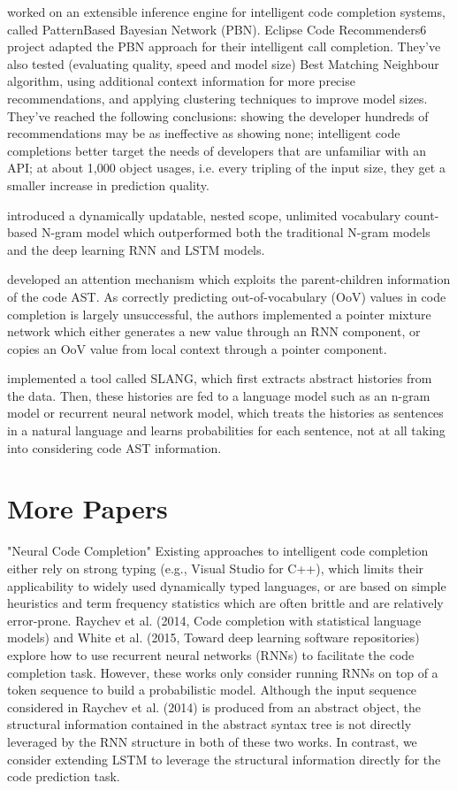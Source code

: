 \cite{Prok15a} worked on an extensible inference engine for intelligent code completion
systems, called PatternBased Bayesian Network (PBN). Eclipse Code Recommenders6 project adapted
the PBN approach for their intelligent call completion. They've also tested (evaluating quality,
speed and model size) Best Matching Neighbour algorithm, using additional context information
for more precise recommendations, and applying clustering techniques to improve model sizes.
They've reached the following conclusions: showing the developer hundreds of recommendations
may be as ineffective as showing none; intelligent code completions better target the needs of
developers that are unfamiliar with an API; at about 1,000 object usages, i.e. every tripling
of the input size, they get a smaller increase in prediction quality.

\cite{Hell17a} introduced a dynamically updatable, nested scope, unlimited vocabulary
count-based N-gram model which outperformed both the traditional N-gram models and the deep
learning RNN and LSTM models.

\cite{Li17a} developed an attention mechanism which exploits the parent-children information of
the code AST. As correctly predicting out-of-vocabulary (OoV) values in code completion is largely
unsuccessful, the authors implemented a pointer mixture network which either generates a new value
through an RNN component, or copies an OoV value from local context through a pointer component.

\cite{Rayc14a} implemented a tool called SLANG, which ﬁrst extracts abstract histories from the data.
Then, these histories are fed to a language model such as an n-gram model or recurrent neural network
model, which treats the histories as sentences in a natural language and learns probabilities for
each sentence, not at all taking into considering code AST information.

\section{More Papers}
"Neural Code Completion"
Existing approaches to intelligent code completion either rely on strong typing (e.g.,
Visual Studio for C++), which limits their applicability to widely used dynamically typed
languages, or are based on simple heuristics and term frequency statistics which are often
brittle and are relatively error-prone. Raychev et al. (2014, Code completion with statistical
language models) and White et al. (2015, Toward deep learning software repositories) explore
how to use recurrent neural networks (RNNs) to facilitate the code completion task. However,
these works only consider running RNNs on top of a token sequence to build a probabilistic
model. Although the input sequence considered in Raychev et al. (2014) is produced from an
abstract object, the structural information contained in the abstract syntax tree is not
directly leveraged by the RNN structure in both of these two works. In contrast, we consider
extending LSTM to leverage the structural information directly for the code prediction task.

